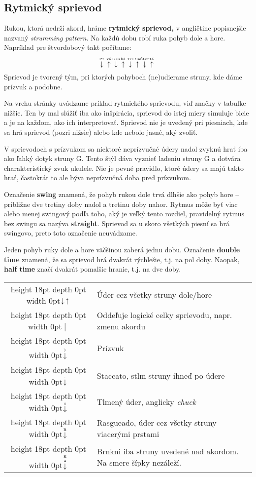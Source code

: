 \subsection*{Rytmický sprievod}

Rukou, ktorá nedrží akord, hráme \textbf{rytmický sprievod,} v angličtine popisnejšie nazvaný
\emph{strumming pattern}. Na každú dobu robí ruka pohyb dole a hore. Napríklad pre štvordobový
takt počítame:
{\larger$$
\PluckDown{Pr}\ \PluckUp{vá}\ \PluckDown{Dru}\ \PluckUp{há}\ 
\PluckDown{Tre}\ \PluckUp{tia}\ \PluckDown{Štvr}\ \PluckUp{tá}\ 
$$}%
Sprievod je tvorený tým, pri ktorých pohyboch (ne)udierame struny, kde dáme prízvuk a podobne.

Na vrchu stránky uvádzame príklad rytmického sprievodu, viď značky v tabuľke nižšie.
Ten by mal slúžiť iba ako inšpirácia, sprievod do istej miery simuluje bicie a je na každom, ako ich
interpretovať. Sprievod nie je uvedený pri piesniach, kde sa hrá \uv{štandardný} sprievod (pozri nižsie)
alebo kde nebolo jasné, aký zvoliť.

V sprievodoch s prízvukom sa niektoré neprízvučné údery nadol zvyknú hrať iba ako ľahký dotyk
struny G. Tento štýl dáva vyznieť ladeniu struny G a dotvára charakteristický zvuk ukulele.
Nie je pevné pravidlo, ktoré údery sa majú takto hrať, častokrát to ale býva neprízvučná doba pred
prízvukom.

Označenie \textbf{swing} znamená, že pohyb rukou dole trvá dlhšie ako pohyb hore -- približne
dve tretiny doby nadol a tretinu doby nahor. Rytmus môže byť viac alebo menej swingový podľa toho,
aký je veľký tento rozdiel, pravidelný rytmus bez swingu sa nazýva \textbf{straight}. Sprievod
sa u skoro všetkých piesní sa hrá swingovo, preto toto označenie neuvádzame.

Jeden pohyb ruky dole a hore väčšinou zaberá jednu dobu. Označenie \textbf{double time} znamená,
že sa sprievod hrá dvakrát rýchlešie, t.j. na pol doby. Naopak, \textbf{half time} značí dvakrát
pomalšie hranie, t.j. na dve doby.

\medskip

\def\mystrut{\vrule height 18pt depth 0pt width 0pt}
\begin{tabularx}{\linewidth}{ c X }
    \mystrut $\Down\Up$ & Úder cez všetky struny dole/hore \\ 
    \mystrut $\hspace{3pt}\big|\hspace{3pt}$ & Oddeľuje logické celky sprievodu, napr. zmenu akordu \\ 
    \mystrut $\AccentDown$ & Prízvuk \\  
    \mystrut $\StaccatoDown$ & Staccato, stlm struny ihneď po údere \\
    \mystrut $\ChuckDown$ & Tlmený úder, anglicky \textit{chuck} \\
    \mystrut $\PluckDown{R}$ & Rasgueado, \uv{vejárovitý} úder cez všetky struny viacerými prstami \\    
    \mystrut $\PluckDown{E A}$ & Brnkni iba struny uvedené nad akordom. Na smere šípky nezáleží. \\
\end{tabularx}


